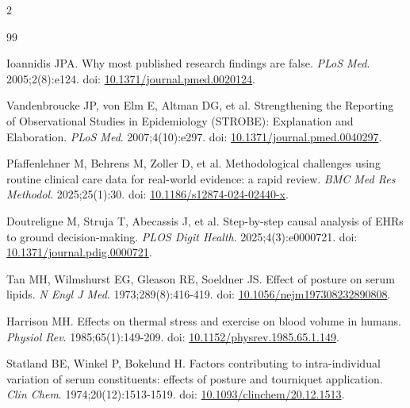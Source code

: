 \documentclass[10pt,letterpaper]{article}
\begin{document}
\begin{multicols}{2}
\footnotesize
\raggedright
\begingroup
\renewcommand{\section}[2]{}
\begin{thebibliography}{99}
\setlength{\itemsep}{1pt}
\setlength{\parskip}{0pt}

 Ioannidis JPA. Why most published research findings are false. \textit{PLoS Med}. 2005;2(8):e124. doi: \href{https://doi.org/10.1371/journal.pmed.0020124}{10.1371/journal.pmed.0020124}.

 Vandenbroucke JP, von Elm E, Altman DG, et al. Strengthening the Reporting of Observational Studies in Epidemiology (STROBE): Explanation and Elaboration. \textit{PLoS Med}. 2007;4(10):e297. doi: \href{https://doi.org/10.1371/journal.pmed.0040297}{10.1371/journal.pmed.0040297}.

 Pfaffenlehner M, Behrens M, Zoller D, et al. Methodological challenges using routine clinical care data for real-world evidence: a rapid review. \textit{BMC Med Res Methodol}. 2025;25(1):30. doi: \href{https://doi.org/10.1186/s12874-024-02440-x}{10.1186/s12874-024-02440-x}.

 Doutreligne M, Struja T, Abecassis J, et al. Step-by-step causal analysis of EHRs to ground decision-making. \textit{PLOS Digit Health}. 2025;4(3):e0000721. doi: \href{https://doi.org/10.1371/journal.pdig.0000721}{10.1371/journal.pdig.0000721}.

 Tan MH, Wilmshurst EG, Gleason RE, Soeldner JS. Effect of posture on serum lipids. \textit{N Engl J Med}. 1973;289(8):416-419. doi: \href{https://doi.org/10.1056/nejm197308232890808}{10.1056/nejm197308232890808}.

 Harrison MH. Effects on thermal stress and exercise on blood volume in humans. \textit{Physiol Rev}. 1985;65(1):149-209. doi: \href{https://doi.org/10.1152/physrev.1985.65.1.149}{10.1152/physrev.1985.65.1.149}.

 Statland BE, Winkel P, Bokelund H. Factors contributing to intra-individual variation of serum constituents: effects of posture and tourniquet application. \textit{Clin Chem}. 1974;20(12):1513-1519. doi: \href{https://doi.org/10.1093/clinchem/20.12.1513}{10.1093/clinchem/20.12.1513}.


\end{thebibliography}
\end{multicols}
\end{document}
